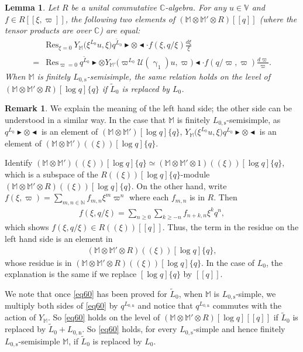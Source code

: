\documentclass[11pt,b5paper,notitlepage]{article}
\theoremstyle{definition}
\newtheorem{rem}[df]{Remark}
\theoremstyle{plain}
\newtheorem{lm}[df]{Lemma}
\newcommand{\mc}{\mathcal}
\newcommand{\wtd}{\widetilde}
\newcommand{\Res}{\mathrm{Res}}
\newcommand{\Vbb}{\mathbb V}
\newcommand{\Mbb}{\mathbb M}
\newcommand{\Cbb}{\mathbb C}
\newcommand{\Nbb}{\mathbb N}
\newcommand{\btl}{\blacktriangleleft}
\newcommand{\btr}{\blacktriangleright}
\newcommand{\Lss}{{L_{0,\mathrm{s}}}}
\newcommand{\Lni}{{L_{0,\mathrm{n}}}}
\numberwithin{equation}{section}
\begin{document}
\begin{lm}\label{lb32}
	Let $R$ be a unital commutative $\Cbb$-algebra.  For any $u\in\Vbb$ and $f\in R[[\xi,\varpi]]$, the following two elements of $(\Mbb\otimes\Mbb'\otimes R)[[q]]$ (where the tensor products are over $\Cbb$) are equal:
	\begin{align}
	&\Res_{\xi=0}~Y_{\Mbb}\big(\xi^{L_0}u,\xi\big)q^{\wtd L_0}\btr\otimes\btl\cdot f(\xi,q/\xi)\frac{d\xi}{\xi}\nonumber\\
	=&\Res_{\varpi=0}~q^{\wtd L_0}\btr\otimes Y_{\Mbb'}\big(\varpi^{L_0}\mc U(\upgamma_1)u,\varpi\big)\btl\cdot f(q/\varpi,\varpi)\frac{d\varpi}{\varpi}.\label{eq60}
	\end{align}
When $\Mbb$ is finitely $\Lss$-semisimple, the same relation holds on the level of $(\Mbb\otimes\Mbb'\otimes R)[\log q]\{q\}$ if $\wtd L_0$ is replaced by $L_0$.
\end{lm}


\begin{rem}\label{lb33}
We  explain the meaning of the left hand side; the other side can be understood in a similar way. In the case that $\Mbb$ is finitely $\Lss$-semisimple, as   $q^{L_0}\btr\otimes\btl$  is an element of $(\Mbb\otimes\Mbb')[\log q]\{q\}$, $Y_{\Mbb}\big(\xi^{L_0}u,\xi\big)q^{L_0}\btr\otimes\btl$ is an element of $(\Mbb\otimes\Mbb')((\xi))[\log q]\{q\}$. 

Identify $(\Mbb\otimes\Mbb')((\xi))[\log q]\{q\}\simeq (\Mbb\otimes\Mbb'\otimes 1)((\xi))[\log q]\{q\}$, which is a subspace of the $R((\xi))[\log q]\{q\}$-module $(\Mbb\otimes\Mbb'\otimes R)((\xi))[\log q]\{q\}$.  On the other hand,  write $f(\xi,\varpi)=\sum_{m,n\in\Nbb}f_{m,n}\xi^m\varpi^n$ where each $f_{m,n}$ is in $R$. Then
	\begin{align*}
	f(\xi,q/\xi)=\sum_{n\geq 0}\sum_{k\geq -n}f_{n+k,n}\xi^k q^n,
	\end{align*}
	which shows $f(\xi,q/\xi)\in R((\xi))[[q]]$. Thus, the term in the residue on the left hand side is an element in
	\begin{align*}
	(\Mbb\otimes\Mbb'\otimes R)((\xi))[\log q]\{q\},
	\end{align*}
	whose residue is in $(\Mbb\otimes\Mbb'\otimes R)((\xi))[\log q]\{q\}$. In the case of $L_0$, the explanation is the same if we replace $[\log q]\{q\}$ by $[[q]]$.
	
We note that once \eqref{eq60} has been proved for $\wtd L_0$, when $\Mbb$ is $\Lss$-simple, we multiply both sides of \eqref{eq60} by $q^\Lni$ and notice that $q^\Lni$ commutes with the action of $Y_\Mbb$. So \eqref{eq60} holds on the level of $(\Mbb\otimes\Mbb'\otimes R)[\log q][[q]]$ if $\wtd L_0$ is replaced by $\wtd L_0+\Lni$. So \eqref{eq60} holds, for every $\Lss$-simple and hence finitely $\Lss$-semisimple $\Mbb$, if $\wtd L_0$ is replaced	by $L_0$.
\end{rem}
\end{document}
